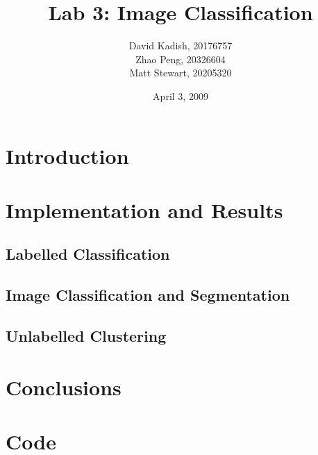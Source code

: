 \documentclass{sydeStyle}
\title{Lab 3: Image Classification}
\author{
    David Kadish, 20176757\\
    Zhao Peng, 20326604\\
    Matt Stewart, 20205320\\
}
\date{April 3, 2009}
\numberwithin{algorithm}{chapter}
\begin{document}

\maketitle

\setcounter{page}{2} %


\chapter{Introduction}


\chapter{Implementation and Results}
\section{Labelled Classification}

\section{Image Classification and Segmentation}
\section{Unlabelled Clustering}



\chapter{Conclusions}


\appendix
\renewcommand{\thechapter}{\Alph{chapter}}

\chapter{Code}
\label{code}

\end{document}
